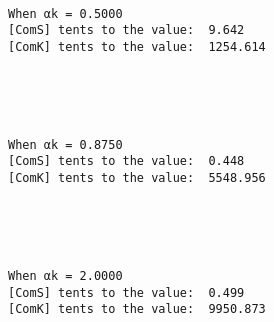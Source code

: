 \documentclass[11pt]{article}
\begin{document}
    \begin{center}
    \end{center}
    { \hspace*{\fill} \\}
    
    \begin{Verbatim}[commandchars=\\\{\}]
When αk = 0.5000
[ComS] tents to the value:  9.642
[ComK] tents to the value:  1254.614

    \end{Verbatim}

    \begin{center}
    \end{center}
    { \hspace*{\fill} \\}
    
    \begin{center}
    \end{center}
    { \hspace*{\fill} \\}
    
    \begin{Verbatim}[commandchars=\\\{\}]
When αk = 0.8750
[ComS] tents to the value:  0.448
[ComK] tents to the value:  5548.956

    \end{Verbatim}

    \begin{center}
    \end{center}
    { \hspace*{\fill} \\}
    
    \begin{center}
    \end{center}
    { \hspace*{\fill} \\}
    
    \begin{Verbatim}[commandchars=\\\{\}]
When αk = 2.0000
[ComS] tents to the value:  0.499
[ComK] tents to the value:  9950.873

    \end{Verbatim}
\end{document}
